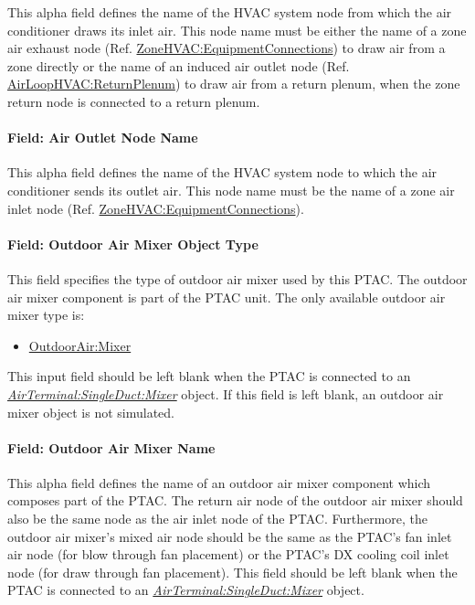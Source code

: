 This alpha field defines the name of the HVAC system node from which the air conditioner draws its inlet air. This node name must be either the name of a zone air exhaust node (Ref. \hyperref[zonehvacequipmentconnections]{ZoneHVAC:EquipmentConnections}) to draw air from a zone directly or the name of an induced air outlet node (Ref. \hyperref[airloophvacreturnplenum]{AirLoopHVAC:ReturnPlenum}) to draw air from a return plenum, when the zone return node is connected to a return plenum.

\paragraph{Field: Air Outlet Node Name}\label{field-air-outlet-node-name-5-001}

This alpha field defines the name of the HVAC system node to which the air conditioner sends its outlet air. This node name must be the name of a zone air inlet node (Ref. \hyperref[zonehvacequipmentconnections]{ZoneHVAC:EquipmentConnections}).

\paragraph{Field: Outdoor Air Mixer Object Type}\label{field-outdoor-air-mixer-object-type-2}

This field specifies the type of outdoor air mixer used by this PTAC. The outdoor air mixer component is part of the PTAC unit. The only available outdoor air mixer type is:

\begin{itemize}
\tightlist
\item
  \hyperref[outdoorairmixer]{OutdoorAir:Mixer}
\end{itemize}

This input field should be left blank when the PTAC is connected to an \textit{\hyperref[airterminalsingleductmixer]{AirTerminal:SingleDuct:Mixer}} object. If this field is left blank, an outdoor air mixer object is not simulated.

\paragraph{Field: Outdoor Air Mixer Name}\label{field-outdoor-air-mixer-name-2}

This alpha field defines the name of an outdoor air mixer component which composes part of the PTAC. The return air node of the outdoor air mixer should also be the same node as the air inlet node of the PTAC. Furthermore, the outdoor air mixer's mixed air node should be the same as the PTAC's fan inlet air node (for blow through fan placement) or the PTAC's DX cooling coil inlet node (for draw through fan placement). This field should be left blank when the PTAC is connected to an \textit{\hyperref[airterminalsingleductmixer]{AirTerminal:SingleDuct:Mixer}} object.

